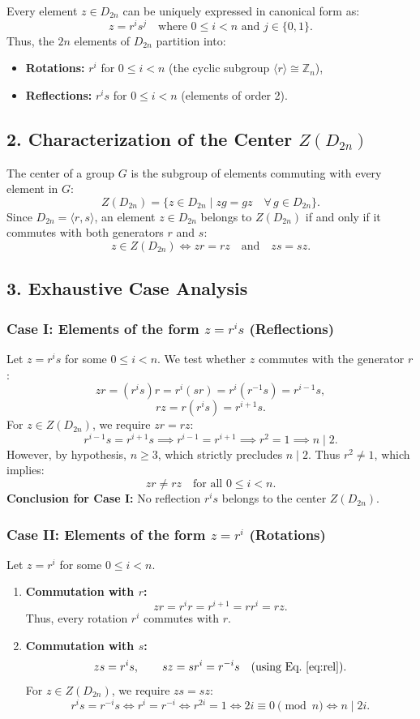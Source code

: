 \documentclass[11pt,a4paper]{article}
\begin{document}
Every element $z \in D_{2n}$ can be uniquely expressed in canonical form as:
\[
z = r^i s^j \quad \text{where } 0 \le i < n \text{ and } j \in \{0, 1\}.
\]
Thus, the $2n$ elements of $D_{2n}$ partition into:
\begin{itemize}\setlength{\itemsep}{1pt}
    \item \textbf{Rotations:} $r^i$ for $0 \le i < n$ (the cyclic subgroup $\langle r \rangle \cong \mathbb{Z}_n$),
    \item \textbf{Reflections:} $r^i s$ for $0 \le i < n$ (elements of order 2).
\end{itemize}

\subsection*{2. Characterization of the Center $Z(D_{2n})$}
The center of a group $G$ is the subgroup of elements commuting with every element in $G$:
\[
Z(D_{2n}) = \big\{ z \in D_{2n} \;\big|\; zg = gz \quad \forall\, g \in D_{2n} \big\}.
\]
Since $D_{2n} = \langle r, s \rangle$, an element $z \in D_{2n}$ belongs to $Z(D_{2n})$ if and only if it commutes with both generators $r$ and $s$:
\[
z \in Z(D_{2n}) \iff zr = rz \quad \text{and} \quad zs = sz.
\]

\subsection*{3. Exhaustive Case Analysis}

\subsubsection*{Case I: Elements of the form $z = r^i s$ (Reflections)}
Let $z = r^i s$ for some $0 \le i < n$. We test whether $z$ commutes with the generator $r$:
\[
zr = (r^i s)r = r^i(sr) = r^i(r^{-1}s) = r^{i-1}s,
\]
\[
rz = r(r^i s) = r^{i+1}s.
\]
For $z \in Z(D_{2n})$, we require $zr = rz$:
\[
r^{i-1}s = r^{i+1}s \implies r^{i-1} = r^{i+1} \implies r^2 = 1 \implies n \mid 2.
\]
However, by hypothesis, $n \ge 3$, which strictly precludes $n \mid 2$. Thus $r^2 \ne 1$, which implies:
\[
zr \ne rz \quad \text{for all } 0 \le i < n.
\]
\textbf{Conclusion for Case I:} No reflection $r^i s$ belongs to the center $Z(D_{2n})$.

\subsubsection*{Case II: Elements of the form $z = r^i$ (Rotations)}
Let $z = r^i$ for some $0 \le i < n$.
\begin{enumerate}
    \item \textbf{Commutation with $r$:}
    \[
    zr = r^i r = r^{i+1} = r r^i = rz.
    \]
    Thus, every rotation $r^i$ commutes with $r$.

    \item \textbf{Commutation with $s$:}
    \[
    zs = r^i s, \qquad sz = s r^i = r^{-i} s \quad \text{(using Eq.~\eqref{eq:rel})}.
    \]
    For $z \in Z(D_{2n})$, we require $zs = sz$:
    \[
    r^i s = r^{-i} s \iff r^i = r^{-i} \iff r^{2i} = 1 \iff 2i \equiv 0 \pmod n \iff n \mid 2i.
    \]
\end{enumerate}
\end{document}
